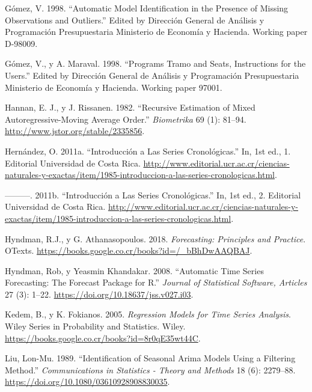 \documentclass[12pt]{article}
\begin{document}
\leavevmode\hypertarget{ref-gomez}{}%
Gómez, V. 1998. ``Automatic Model Identification in the Presence of
Missing Observations and Outliers.'' Edited by Dirección General de
Análisis y Programación Presupuestaria Ministerio de Economía y
Hacienda. Working paper D-98009.

\leavevmode\hypertarget{ref-tramo}{}%
Gómez, V., y A. Maraval. 1998. ``Programs Tramo and Seats,
Instructions for the Users.'' Edited by Dirección General de Análisis y
Programación Presupuestaria Ministerio de Economía y Hacienda. Working
paper 97001.

\leavevmode\hypertarget{ref-hannan}{}%
Hannan, E. J., y J. Rissanen. 1982. ``Recursive Estimation of Mixed
Autoregressive-Moving Average Order.'' \emph{Biometrika} 69 (1): 81--94.
\url{http://www.jstor.org/stable/2335856}.

\leavevmode\hypertarget{ref-oscarh-1}{}%
Hernández, O. 2011a. ``Introducción a Las Series Cronológicas.'' In, 1st
ed., 1. Editorial Universidad de Costa Rica.
\url{http://www.editorial.ucr.ac.cr/ciencias-naturales-y-exactas/item/1985-introduccion-a-las-series-cronologicas.html}.

\leavevmode\hypertarget{ref-oscarh-2}{}%
---------. 2011b. ``Introducción a Las Series Cronológicas.'' In, 1st
ed., 2. Editorial Universidad de Costa Rica.
\url{http://www.editorial.ucr.ac.cr/ciencias-naturales-y-exactas/item/1985-introduccion-a-las-series-cronologicas.html}.

\leavevmode\hypertarget{ref-hyndman2018forecasting}{}%
Hyndman, R.J., y G. Athanasopoulos. 2018. \emph{Forecasting:
Principles and Practice}. OTexts.
\url{https://books.google.co.cr/books?id=/_bBhDwAAQBAJ}.

\leavevmode\hypertarget{ref-auto.arima}{}%
Hyndman, Rob, y Yeasmin Khandakar. 2008. ``Automatic Time Series
Forecasting: The Forecast Package for R.'' \emph{Journal of Statistical
Software, Articles} 27 (3): 1--22.
\url{https://doi.org/10.18637/jss.v027.i03}.

\leavevmode\hypertarget{ref-kedem}{}%
Kedem, B., y K. Fokianos. 2005. \emph{Regression Models for Time
Series Analysis}. Wiley Series in Probability and Statistics. Wiley.
\url{https://books.google.co.cr/books?id=8r0qE35wt44C}.

\leavevmode\hypertarget{ref-liu}{}%
Liu, Lon-Mu. 1989. ``Identification of Seasonal Arima Models Using a
Filtering Method.'' \emph{Communications in Statistics - Theory and
Methods} 18 (6): 2279--88.
\url{https://doi.org/10.1080/03610928908830035}.
\end{document}
